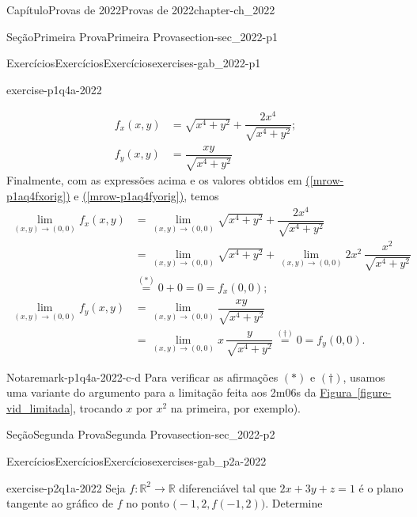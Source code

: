 \documentclass[oneside,10pt,]{book}
\newcommand{\xreffont}{\relax}
\numberwithin{equation}{section}
\newcommand{\R}{\mathbb R}
\begin{document}
\begin{chapterptx}{Capítulo}{Provas de 2022}{}{Provas de 2022}{}{}{chapter-ch_2022}
\begin{sectionptx}{Seção}{Primeira Prova}{}{Primeira Prova}{}{}{section-sec_2022-p1}
\begin{exercises-subsection-numberless}{Exercícios}{Exercícios}{}{Exercícios}{}{}{exercises-gab_2022-p1}
\begin{divisionexercise}{4}{}{}{exercise-p1q4a-2022}
\begin{itemize}[label=\textbullet]
\begin{align}
f_x(x,y)&=\sqrt{x^4+y^2}+\dfrac{2x^4}{\sqrt{x^4+y^2}};\label{mrow-p1aq4fx}\\
f_y(x,y)&=\dfrac{xy}{\sqrt{x^4+y^2}}\label{mrow-p1aq4fy}
\end{align}
Finalmente, com as expressões acima e os valores obtidos em \hyperref[mrow-p1aq4fxorig]{({\xreffont\ref{mrow-p1aq4fxorig}})} e \hyperref[mrow-p1aq4fyorig]{({\xreffont\ref{mrow-p1aq4fyorig}})}, temos%
\begin{align*}
\lim\limits_{(x,y)\to(0,0)}f_x(x,y)
&=\lim\limits_{(x,y)\to(0,0)}\sqrt{x^4+y^2}+\dfrac{2x^4}{\sqrt{x^4+y^2}}\\
&=\lim\limits_{(x,y)\to(0,0)}\sqrt{x^4+y^2}+\lim\limits_{(x,y)\to(0,0)}2x^2\,\dfrac{x^2}{\sqrt{x^4+y^2}}\\
&\stackrel{(*)}=0+0=0=f_x(0,0);\\
\lim\limits_{(x,y)\to(0,0)}f_y(x,y)
&=\lim\limits_{(x,y)\to(0,0)}\dfrac{xy}{\sqrt{x^4+y^2}}\\
&=\lim\limits_{(x,y)\to(0,0)}x\,\dfrac{y}{\sqrt{x^4+y^2}}\stackrel{(\dagger)}{=}0=f_y(0,0).
\end{align*}
%
\end{itemize}
%
\begin{remark}{Nota}{}{remark-p1q4a-2022-c-d}%
Para verificar as afirmações \((\ast)\) e \((\dagger)\), usamos uma variante do argumento para a limitação feita aos 2m06s da \hyperref[figure-vid_limitada]{Figura~{\xreffont\ref{figure-vid_limitada}}}, trocando \(x\) por \(x^2\) na primeira, por exemplo).\end{remark}
\end{divisionexercise}%
\end{exercises-subsection-numberless}
\end{sectionptx}
%
%
\typeout{************************************************}
\typeout{************************************************}
%
\begin{sectionptx}{Seção}{Segunda Prova}{}{Segunda Prova}{}{}{section-sec_2022-p2}
%
%
\typeout{************************************************}
\typeout{************************************************}
%
\begin{exercises-subsection-numberless}{Exercícios}{Exercícios}{}{Exercícios}{}{}{exercises-gab_p2a-2022}
\begin{divisionexercise}{1}{}{}{exercise-p2q1a-2022}%
Seja \(f\colon\R^2\to\R\) diferenciável tal que \(2x+3y+z=1\) é o plano tangente ao gráfico de \(f\) no ponto \(\big(-1,2, f(-1,2)\big)\). Determine%

\end{divisionexercise}
\end{exercises-subsection-numberless}
\end{sectionptx}
\end{chapterptx}
\end{document}
